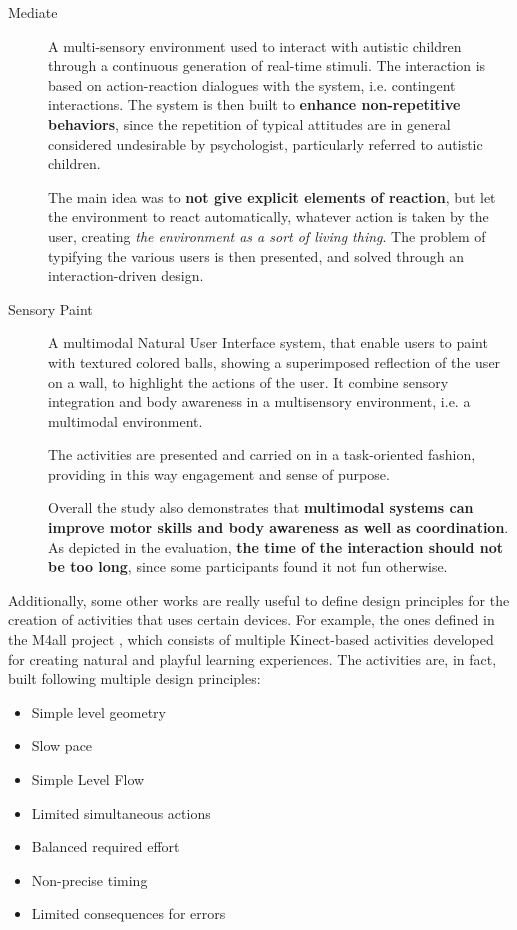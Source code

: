 \begin{description}
	\item[Mediate] A multi-sensory environment used to interact  with autistic children through a continuous generation of real-time stimuli. The interaction is based on action-reaction dialogues with the system, i.e. contingent interactions.
	The system is then built to \textbf{enhance non-repetitive behaviors}, since the repetition of typical attitudes are in general considered undesirable by psychologist, particularly referred to autistic children.
	
	The main idea was to \textbf{not give explicit elements of reaction}, but let the environment to react automatically, whatever action is taken by the user, creating \textit{the environment as a sort of living thing}. 
	The problem of typifying the various users is then presented, and solved through an interaction-driven design.
	
	\item[Sensory Paint] A multimodal Natural User Interface system, that enable users to paint with textured colored balls, showing a superimposed reflection of the user on a wall, to highlight the actions of the user. 
	It combine sensory integration and body awareness in a multisensory environment, i.e. a multimodal environment.
	
	The activities are presented and carried on in a task-oriented fashion, providing in this way engagement and sense of purpose.
	
	Overall the study also demonstrates that \textbf{multimodal systems can improve motor skills and body awareness as well as coordination}.
	As depicted in the evaluation, \textbf{the time of the interaction should not be too long}, since some participants found it not fun otherwise.
\end{description}

Additionally, some other works are really useful to define design principles for the creation of activities that uses certain devices. 
For example, the ones defined in the M4all project \cite{birchfield_embodiment_2008}, which consists of multiple Kinect-based activities developed for creating natural and playful learning experiences.
The activities are, in fact, built following multiple design principles:

\begin{itemize}
	\item Simple level geometry
	\item Slow pace
	\item Simple Level Flow
	\item Limited simultaneous actions
	\item Balanced required effort
	\item Non-precise timing 
	\item Limited consequences for errors
\end{itemize}

